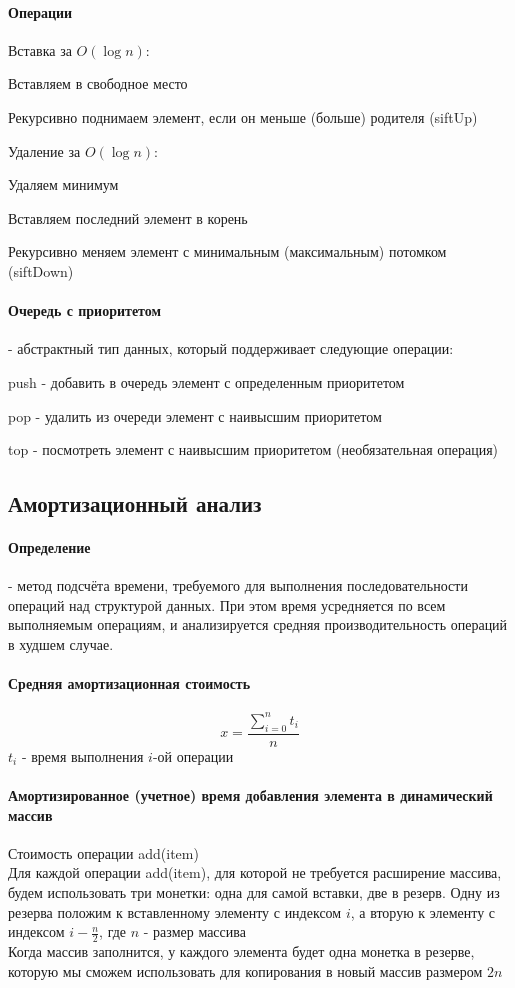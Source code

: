 \documentclass[a4paper,10pt]{article}
\begin{document}
	\paragraph{Операции}
	Вставка за $O(\log{n})$:
	\begin{center}
		\item Вставляем в свободное место
		\item Рекурсивно поднимаем элемент, если он меньше (больше) родителя (siftUp)
	\end{center}
	Удаление за $O(\log{n})$:
	\begin{center}
		\item Удаляем минимум
		\item Вставляем последний элемент в корень
		\item Рекурсивно меняем элемент с минимальным (максимальным) потомком (siftDown)
	\end{center}
	\paragraph{Очередь с приоритетом}
	- абстрактный тип данных, который поддерживает следующие операции: 
	\begin{center}
		\item push - добавить в очередь элемент с определенным приоритетом
		\item pop - удалить из очереди элемент с наивысшим приоритетом
		\item top - посмотреть элемент с наивысшим приоритетом (необязательная операция)
	\end{center}
	\subsection{Амортизационный анализ}
	\paragraph{Определение}
	- метод подсчёта времени, требуемого для выполнения последовательности операций над структурой данных. При этом время усредняется по всем выполняемым операциям, и анализируется средняя производительность операций в худшем случае.
	\paragraph{Средняя амортизационная стоимость}
	\[
		x = \frac{\sum_{i=0}^{n} t_{i}}{n}
	\]
	$t_{i}$ - время выполнения $i$-ой операции
	\paragraph{Амортизированное (учетное) время добавления элемента в динамический массив}
	Стоимость операции add(item) \\
	Для каждой операции add(item), для которой не требуется расширение массива, будем использовать три монетки: одна для самой вставки, две в резерв. Одну из резерва положим к вставленному элементу с индексом $i$, а вторую к элементу с индексом $i - \frac{n}{2}$, где $n$ - размер массива\\
	Когда массив заполнится, у каждого элемента будет одна монетка в резерве, которую мы сможем использовать для копирования в новый массив размером $2n$ \\
\end{document}
